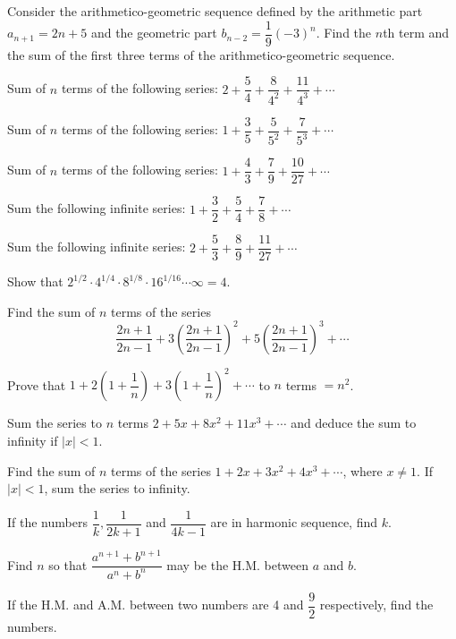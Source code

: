 \documentclass[11pt,a4paper]{article}
\begin{document}
\begin{longlist}
\item Consider the arithmetico-geometric sequence defined by the arithmetic part $a_{n+1}=2n+5$ and the geometric part $b_{n-2}=\dfrac{1}{9}(-3)^n$. Find the $n$th term and the sum of the first three terms of the arithmetico-geometric sequence.

\item Sum of $n$ terms of the following series: $2+\dfrac{5}{4}+\dfrac{8}{4^2}+\dfrac{11}{4^3}+\cdots$

\item Sum of $n$ terms of the following series: $1+\dfrac{3}{5}+\dfrac{5}{5^2}+\dfrac{7}{5^3}+\cdots$

\item Sum of $n$ terms of the following series: $1+\dfrac{4}{3}+\dfrac{7}{9}+\dfrac{10}{27}+\cdots$

\item Sum the following infinite series: $1+\dfrac{3}{2}+\dfrac{5}{4}+\dfrac{7}{8}+\cdots$

\item Sum the following infinite series: $2+\dfrac{5}{3}+\dfrac{8}{9}+\dfrac{11}{27}+\cdots$

\item Show that $2^{1/2}\cdot4^{1/4}\cdot8^{1/8}\cdot16^{1/16}\cdots\infty = 4$.

\item Find the sum of $n$ terms of the series
\[
\frac{2n+1}{2n-1}+3\left(\frac{2n+1}{2n-1}\right)^2+5\left(\frac{2n+1}{2n-1}\right)^3+\cdots
\]

\item Prove that $1+2\left(1+\dfrac{1}{n}\right)+3\left(1+\dfrac{1}{n}\right)^2+\cdots$ to $n$ terms $=n^2$.

\item Sum the series to $n$ terms $2+5x+8x^2+11x^3+\cdots$ and deduce the sum to infinity if $|x|<1$.

\item Find the sum of $n$ terms of the series $1+2x+3x^2+4x^3+\cdots$, where $x\neq1$. If $|x|<1$, sum the series to infinity.

\item If the numbers $\dfrac{1}{k}, \dfrac{1}{2k+1}$ and $\dfrac{1}{4k-1}$ are in harmonic sequence, find $k$.

\item Find $n$ so that $\dfrac{a^{n+1}+b^{n+1}}{a^n+b^n}$ may be the H.M. between $a$ and $b$.

\item If the H.M. and A.M. between two numbers are 4 and $\dfrac{9}{2}$ respectively, find the numbers.


\end{longlist}
\end{document}
